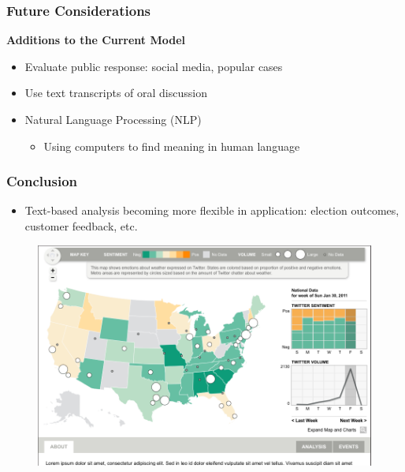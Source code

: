 \documentclass{beamer}
\begin{document}

\begin{frame}[fragile] %
\frametitle{Future Considerations}
\textbf{Additions to the Current Model}
\begin{itemize}
	\item Evaluate public response: social media, popular cases
	\item Use text transcripts of oral discussion
	\item Natural Language Processing (NLP)
	\begin{itemize}
		\item Using computers to find meaning in human language
	\end{itemize}
\end{itemize}


\end{frame}

\begin{frame}
\frametitle{Conclusion}

\begin{itemize}
	\item Text-based analysis becoming more flexible in application: election outcomes, customer feedback, etc.
\end{itemize}

\begin{figure}[h]
\begin{center}
\includegraphics[width=0.8\columnwidth]{weather}
\end{center}
\end{figure}
\end{frame}
\end{document}
